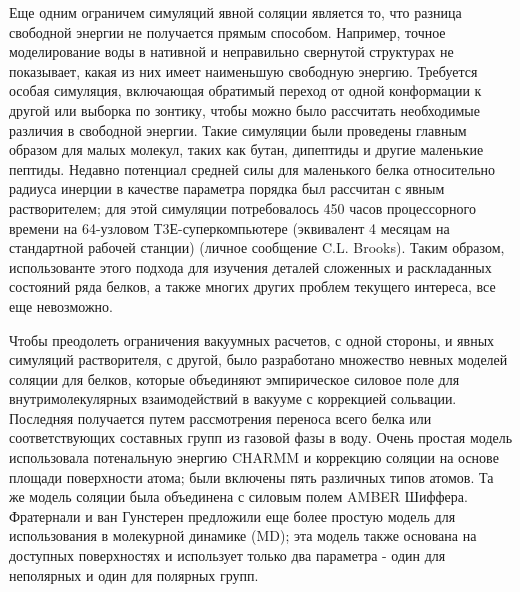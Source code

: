 Еще одним ограничем симуляций явной соляции является то, что разница свободной энергии не получается прямым способом. Например, точное моделирование воды в нативной и неправильно свернутой структурах не показывает, какая из них имеет наименьшую свободную энергию. Требуется особая симуляция, включающая обратимый переход от одной конформации к другой или выборка по зонтику, чтобы можно было рассчитать необходимые различия в свободной энергии. Такие симуляции были проведены главным образом для малых молекул, таких как бутан, дипептиды и другие маленькие пептиды. Недавно потенциал средней силы для маленького белка относительно радиуса инерции в качестве параметра порядка был рассчитан с явным растворителем; для этой симуляции потребовалось 450 часов процессорного времени на 64-узловом Т3Е-суперкомпьютере (эквивалент 4 месяцам на стандартной рабочей станции) (личное сообщение C.L. Brooks). Таким образом, использованте этого подхода для изучения деталей сложенных и раскладанных состояний ряда белков, а также многих других проблем текущего интереса, все еще невозможно. 

Чтобы преодолеть ограничения вакуумных расчетов, с одной стороны, и явных симуляций растворителя, с другой, было разработано множество невных моделей соляции для белков, которые объединяют эмпирическое силовое поле для внутримолекулярных взаимодействий в вакууме с коррекцией сольвации. Последняя получается путем рассмотрения переноса всего белка или соответствующих составных групп из газовой фазы в воду. Очень простая модель использовала потенальную энергию CHARMM и коррекцию соляции на основе площади поверхности атома; были включены пять различных типов атомов. Та же модель соляции была объединена с силовым полем AMBER Шиффера. Фратернали и ван Гунстерен предложили еще более простую модель для использования в молекурной динамике (MD); эта модель также основана на доступных поверхностях и использует только два параметра - один для неполярных и один для полярных групп.

